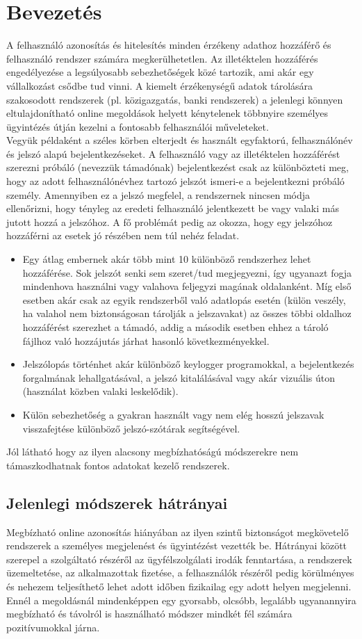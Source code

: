 \section{Bevezetés}
A felhasználó azonosítás és hitelesítés minden érzékeny adathoz hozzáférő és felhasználó rendszer számára megkerülhetetlen. Az illetéktelen hozzáférés engedélyezése a legsúlyosabb sebezhetőségek közé tartozik, ami akár egy vállalkozást csődbe tud vinni.
A kiemelt érzékenységű adatok tárolására szakosodott rendszerek (pl. közigazgatás, banki rendszerek) a jelenlegi könnyen eltulajdonítható online megoldások helyett kénytelenek többnyire személyes ügyintézés útján kezelni a fontosabb felhasználói műveleteket.
\\
Vegyük példaként a széles körben elterjedt és használt egyfaktorú,  felhasználónév és jelszó alapú bejelentkezéseket. A felhasználó vagy az illetéktelen hozzáférést szerezni próbáló (nevezzük támadónak) bejelentkezést csak az különbözteti meg, hogy az adott felhasználónévhez tartozó jelszót ismeri-e a bejelentkezni próbáló személy. Amennyiben ez a jelszó megfelel, a rendszernek 
nincsen módja ellenőrizni, hogy tényleg az eredeti felhasználó jelentkezett be vagy valaki más jutott hozzá a jelszóhoz. A fő problémát pedig az okozza, hogy egy jelszóhoz hozzáférni az esetek jó részében nem túl nehéz feladat.
\begin{itemize}
\item Egy átlag embernek akár több mint 10 különböző rendszerhez lehet hozzáférése. Sok jelszót senki sem szeret/tud megjegyezni, így ugyanazt fogja mindenhova használni vagy valahova feljegyzi magának oldalanként. Míg első esetben akár csak az egyik rendszerből való adatlopás esetén (külön veszély, ha valahol nem biztonságosan tárolják a jelszavakat) az összes többi oldalhoz hozzáférést
 szerezhet a támadó, addig a második esetben ehhez a tároló fájlhoz való hozzájutás járhat hasonló következményekkel.
\item Jelszólopás történhet akár különböző keylogger programokkal, a bejelentkezés forgalmának lehallgatásával, a jelszó kitalálásával vagy akár vizuális úton (használat közben valaki leskelődik).
\item Külön sebezhetőség a gyakran használt vagy nem elég hosszú jelszavak visszafejtése különböző jelszó-szótárak segítségével.
\end{itemize}
Jól látható hogy az ilyen alacsony megbízhatóságú módszerekre nem támaszkodhatnak fontos adatokat kezelő rendszerek.
\subsection{Jelenlegi módszerek hátrányai}
Megbízható online azonosítás hiányában az ilyen szintű biztonságot megkövetelő rendszerek a személyes megjelenést és ügyintézést vezették be. Hátrányai között szerepel a szolgáltató részéről az ügyfélszolgálati irodák fenntartása, a rendszerek üzemeltetése, az alkalmazottak fizetése, a felhasználók részéről pedig körülményes és nehezem teljesíthető lehet adott időben fizikailag egy adott helyen megjelenni. Ennél a megoldásnál mindenképpen egy gyorsabb, olcsóbb, legalább ugyanannyira megbízható és távolról is használható módszer mindkét fél számára pozitívumokkal járna.
